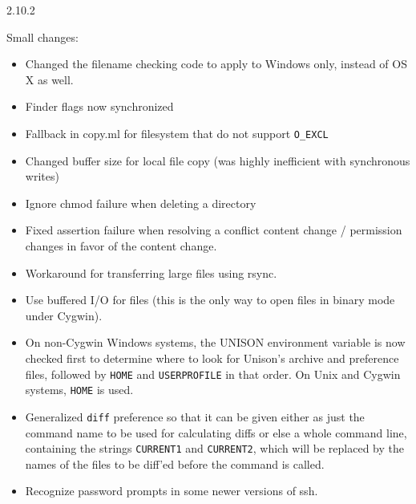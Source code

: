 \begin{changesfromversion}{2.10.2}
\item Small changes:
\begin{itemize}
\item Changed the filename checking code to apply to Windows only, instead
  of OS X as well.
\item Finder flags now synchronized
\item Fallback in copy.ml for filesystem that do not support \verb|O_EXCL|
\item  Changed buffer size for local file copy (was highly inefficient with
  synchronous writes)
\item Ignore chmod failure when deleting a directory
\item  Fixed assertion failure when resolving a conflict content change /
  permission changes in favor of the content change.
\item Workaround for transferring large files using rsync.
\item Use buffered I/O for files (this is the only way to open files in binary
  mode under Cygwin).
\item On non-Cygwin Windows systems, the UNISON environment variable is now checked first to determine 
  where to look for Unison's archive and preference files, followed by \verb|HOME| and 
  \verb|USERPROFILE| in that order.  On Unix and Cygwin systems, \verb|HOME| is used.
\item Generalized \verb|diff| preference so that it can be given either as just 
  the command name to be used for calculating diffs or else a whole command
  line, containing the strings \verb|CURRENT1| and \verb|CURRENT2|, which will be replaced
  by the names of the files to be diff'ed before the command is called.
\item Recognize password prompts in some newer versions of ssh.
\end{itemize}
\end{changesfromversion}


